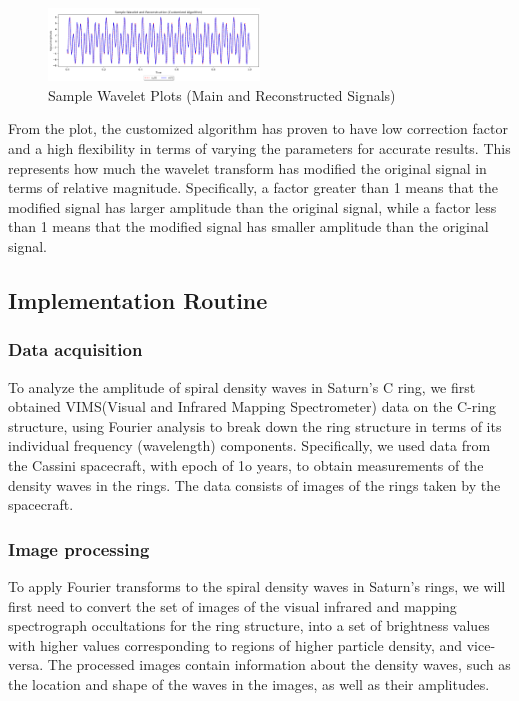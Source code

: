 \documentclass[conference]{IEEEtran}
\begin{document}

\begin{figure}[h]
\centering 
\includegraphics[width=0.5\textwidth]{Python_Wavelet_Transform_Plot_Combined.png} 
\caption{Sample Wavelet Plots (Main and Reconstructed Signals)} \label{fig:my_label}
\end{figure}

From the plot, the customized algorithm has proven to have low correction factor and a high flexibility in terms of varying the parameters for accurate results. This represents how much the wavelet transform has modified the original signal in terms of relative magnitude. Specifically, a factor greater than 1 means that the modified signal has larger amplitude than the original signal, while a factor less than 1 means that the modified signal has smaller amplitude than the original signal.

\subsection{Implementation Routine}
\subsubsection{Data acquisition}
To analyze the amplitude of spiral density waves in Saturn's C ring, we first obtained VIMS(Visual and Infrared Mapping Spectrometer) data on the C-ring structure, using Fourier analysis to break down the ring structure in terms of its individual frequency (wavelength) components. Specifically, we used data from the Cassini spacecraft, with epoch of 1o years, to obtain measurements of the density waves in the rings. The data consists of images of the rings taken by the spacecraft.
\subsubsection{Image processing}To apply Fourier transforms to the spiral density waves in Saturn's rings, we will first need to convert the set of images of the visual infrared and mapping spectrograph occultations for the ring structure, into a set of brightness values with higher values corresponding to regions of higher particle density, and vice-versa. The processed images contain information about the density waves, such as the location and shape of the waves in the images, as well as their amplitudes.
\end{document}

